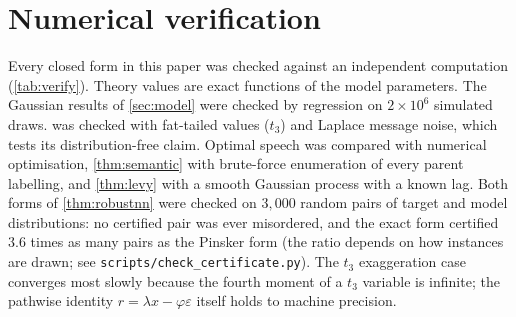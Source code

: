 \documentclass{article}
\theoremstyle{plain}
\theoremstyle{definition}
\theoremstyle{remark}
\begin{document}
\section{Numerical verification}\label{app:verify}\label{sec:verify}
Every closed form in this paper was checked against an independent computation (\cref{tab:verify}). Theory values are exact functions of the model parameters. The Gaussian results of \cref{sec:model} were checked by regression on $2\times10^6$ simulated draws.  was checked with fat-tailed values ($t_3$) and Laplace message noise, which tests its distribution-free claim. Optimal speech was compared with numerical optimisation, \cref{thm:semantic} with brute-force enumeration of every parent labelling, and \cref{thm:levy} with a smooth Gaussian process with a known lag. Both forms of \cref{thm:robustnn} were checked on $3{,}000$ random pairs of target and model distributions: no certified pair was ever misordered, and the exact form certified $3.6$ times as many pairs as the Pinsker form (the ratio depends on how instances are drawn; see \texttt{scripts/check\_certificate.py}). The $t_3$ exaggeration case converges most slowly because the fourth moment of a $t_3$ variable is infinite; the pathwise identity $r=\lambda x-\varphi\varepsilon$ itself holds to machine precision.
\end{document}
